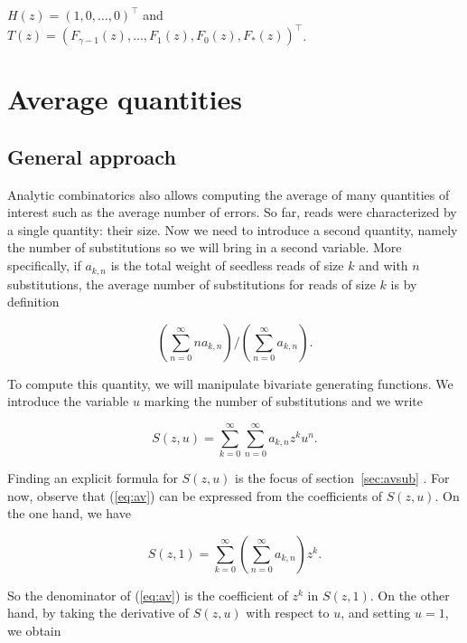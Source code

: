 \documentclass{article}
\begin{document}
$H(z)=(1,0,\ldots,0)^\top$ and $T(z)=(F_{\gamma-1}(z), \ldots, F_1(z),
F_0(z), F_*(z))^\top$.









\section{Average quantities}
\label{sec:av}

\subsection{General approach}
\label{sec:genapp}
Analytic combinatorics also allows computing the average of many
quantities of interest such as the average number of errors.  So far,
reads were characterized by a single quantity: their size. Now we need to
introduce a second quantity, namely the number of substitutions so we will
bring in a second variable. More specifically, if $a_{k,n}$ is the total
weight of seedless reads of size $k$ and with $n$ substitutions, the
average number of substitutions for reads of size $k$ is by definition


\begin{equation}
\label{eq:av}
\left( \sum_{n=0}^\infty na_{k,n} \right) \Big/
 \left( \sum_{n=0}^\infty a_{k,n} \right).
\end{equation}

To compute this quantity, we will manipulate bivariate generating
functions. We introduce the variable $u$ marking the number of
substitutions and we write

\begin{equation*}
S(z,u) = \sum_{k=0}^\infty\sum_{n=0}^\infty a_{k,n}z^ku^n.
\end{equation*}

Finding an explicit formula for $S(z,u)$ is the focus of
section~\ref{sec:avsub} .  For now, observe that (\ref{eq:av}) can be
expressed from the coefficients of $S(z,u)$. On the one hand, we have

\begin{equation*}
S(z,1) = \sum_{k=0}^\infty \left( \sum_{n=0}^\infty a_{k,n} \right) z^k.
\end{equation*}

So the denominator of (\ref{eq:av}) is the coefficient of $z^k$ in
$S(z,1)$. On the other hand, by taking the derivative of $S(z,u)$ with
respect to $u$, and setting $u=1$, we obtain
\end{document}
